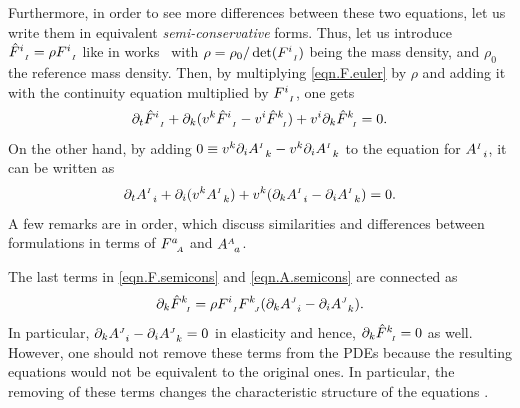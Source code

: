 \documentclass[
10pt, %
a4paper, %
oneside, %
headinclude,footinclude, %
BCOR5mm, %
]{scrartcl}
\newcommand{\pd}{\partial}
\newcommand{\F}[2]{F^{#1}_{\ \, \mathsmaller#2}}
\newcommand{\hatF}[2]{\hat{F}^{#1}_{\ \, \mathsmaller#2}}
\newcommand{\A}[2]{A^{\mathsmaller#1}_{\ \, #2}}
\begin{document}
 
Furthermore, in order to see more differences between these two equations, let us write 
them in equivalent \textit{semi-conservative} forms. 
Thus, let us introduce $ \hatF{i}{I} = \rho \F{i}{I} $ like in 
works~\cite{GodRom2003,Markus2009} with $ \rho = \rho_0/\det(\F{i}{I})$ being the mass density, and 
$ \rho_0 $ the reference mass density. Then, by multiplying \eqref{eqn.F.euler} by $ \rho $ and 
adding 
it with 
the continuity equation multiplied by $ \F{i}{I} $, one gets
\begin{equation}\label{eqn.F.semicons}
\pd_t\hatF{i}{I} + \pd_k (v^k \hatF{i}{I} - v^i \hatF{k}{I}) + v^i \pd_k\hatF{k}{I} = 0.
\end{equation}
On the other hand, by adding $ 0 \equiv v^k\pd_i\A{I}{k} - v^k\pd_i\A{I}{k} $ to the equation for $ 
\A{I}{i} $, it can be written as
\begin{equation}\label{eqn.A.semicons}
\pd_t \A{I}{i} + \pd_i (v^k \A{I}{k}) + v^k (\pd_k \A{I}{i} - \pd_i \A{I}{k})  = 0.
\end{equation}
A few remarks are in order, which discuss similarities and differences between formulations 
in terms of $ \F{a}{A} $ and $ \A{A}{a} $.

\begin{remark}\label{rem.div.curl}
The last terms in \eqref{eqn.F.semicons} and \eqref{eqn.A.semicons} are 
connected as
\begin{equation}
\pd_k \hatF{k}{I} = \rho \F{i}{I}\F{k}{J}(\pd_k \A{J}{i} - \pd_i \A{J}{k}).
\end{equation}
In particular, $ \pd_k \A{J}{i} - \pd_i \A{J}{k} = 0 $ in elasticity and hence, $ 
\pd_k\hatF{k}{I} = 0 $ as well. However, one should not remove these terms from the PDEs because 
the 
resulting equations would not be equivalent to the original ones. In 
particular, the removing of these terms changes the characteristic structure of 
the equations \cite{SHTC-GENERIC}. 
\end{remark}
\end{document}
